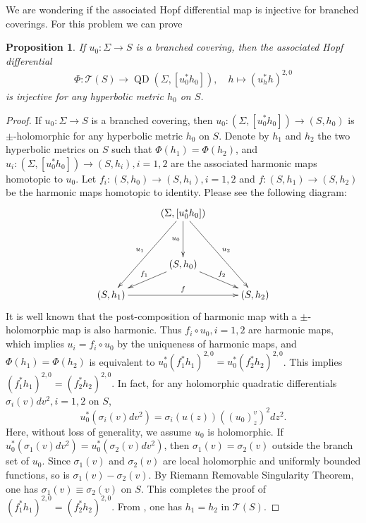 \documentclass[11pt]{amsart}
\numberwithin{equation}{section}
\def\mc{\mathcal}
\theoremstyle{plain}
\newtheorem{prop}[thm]{Proposition}
\theoremstyle{definition}
\theoremstyle{definition}
\def\op{\operatorname}
\begin{document}
We are wondering if the associated Hopf differential map is injective for branched coverings. For this problem we can prove
\begin{prop}
If $u_0:\Sigma\to S$ is a branched covering, then the associated Hopf differential 
	\begin{align*}
	\Phi: \mc{T}(S)\to \op{QD}(\Sigma,[u_0^*h_0]),\quad h \mapsto (u^*_hh)^{2,0}
\end{align*}
is injective for any hyperbolic metric $h_0$ on $S$.
\end{prop}
\begin{proof}
	If $u_0:\Sigma\to S$ is a branched covering, then $u_0:(\Sigma,[u_0^*h_0])\to (S,h_0)$ is $\pm$-holomorphic for any hyperbolic metric $h_0$ on $S$. Denote by $h_1$ and $h_2$ the two hyperbolic metrics on $S$ such that $\Phi(h_1)=\Phi(h_2)$, and $u_i:(\Sigma,[u_0^*h_0])\to (S,h_i), i=1,2$ are the associated harmonic maps  homotopic to $u_0$. Let $f_i:(S,h_0)\to (S,h_i),i=1,2$ and $f:(S,h_1)\to (S,h_2)$ be the harmonic maps homotopic to identity. Please see the following diagram:
\[
\xymatrix@C=30pt@R=15pt{
&(\Sigma,[u_0^*h_0])\ar[lddd]_{u_1}\ar[rddd]^{u_2}\ar[dd]_{u_0}\\
\\
&(S,h_0)\ar[ld]_{f_1}\ar[rd]^{f_2}\\
(S,h_1)\ar[rr]^f&& (S,h_2)
}
\]
It is well known that the post-composition of harmonic map with a $\pm$-holomorphic map is also harmonic. Thus $f_i\circ u_0, i=1,2$ are harmonic maps, which implies $u_i=f_i\circ u_0$ by the uniqueness of harmonic maps, and $\Phi(h_1)=\Phi(h_2)$ is equivalent to $u_0^*(f_1^*h_1)^{2,0}=u_0^*(f_2^*h_2)^{2,0}$. This implies $(f_1^*h_1)^{2,0}=(f_2^*h_2)^{2,0}$. In fact, for any holomorphic quadratic differentials $\sigma_i(v)dv^2,i=1,2$ on $S$,  
$$u_0^*(\sigma_i(v)dv^2)=\sigma_i(u(z))((u_0)^v_z)^2dz^2.$$
Here, without loss of generality, we assume $u_0$ is holomorphic. If $u_0^*(\sigma_1(v)dv^2)=u_0^*(\sigma_2(v)dv^2)$, then $\sigma_1(v)=\sigma_2(v)$ outside the branch set of $u_0$. Since $\sigma_1(v)$ and $\sigma_2(v)$ are local holomorphic and uniformly bounded functions, so is $\sigma_1(v)-\sigma_2(v)$. By Riemann Removable Singularity Theorem, one has $\sigma_1(v)\equiv \sigma_2(v)$ on $S$. This completes the proof of $(f_1^*h_1)^{2,0}=(f_2^*h_2)^{2,0}$. From \cite[Theorem 12]{Sampson}, one has $h_1=h_2$ in $\mc{T}(S)$.
\end{proof}
\end{document}
